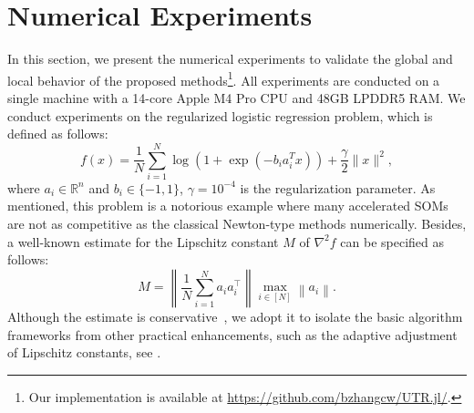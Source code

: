 \documentclass{article}
\begin{document}
\section{Numerical Experiments}\label{sec.experiments}
In this section, we present the numerical experiments to validate the global and local behavior of the proposed methods\footnote{Our implementation is available at \url{https://github.com/bzhangcw/UTR.jl/}.}. All experiments are conducted on a single machine with a 14-core Apple M4 Pro CPU and 48GB LPDDR5 RAM.
We conduct experiments on the regularized logistic regression problem, which is defined as follows:
\begin{equation}
    \label{eq.logistic regression}
    f(x) = \frac{1}{N} \sum_{i=1}^N \log (1 + \exp (-b_i a_i^T x)) + \frac{\gamma}{2}\|x\|^2,
\end{equation}
where $a_i \in \mathbb{R}^n$ and $b_i \in \{-1, 1\}$, $\gamma = 10^{-4}$ is the regularization parameter.
As mentioned, this problem is a notorious example where many accelerated SOMs are not as competitive as the classical Newton-type methods \cite{carmon2022optimal,chen2022accelerating,zhang2012on} numerically.
Besides, a well-known estimate for the Lipschitz constant $\widehat M$ of $\nabla^2 f$ can be specified as follows:
$$\widehat M = \left\|\frac{1}{N} \sum_{i=1}^N a_i a_i^{\top}\right\| \max _{i \in[N]}\left\|a_i\right\|.$$
Although the estimate is conservative~\cite{song2021unified}, we adopt it to isolate the basic algorithm frameworks from other practical enhancements, such as the adaptive adjustment of Lipschitz constants, see \cite{mishchenko2023regularized,cartis2011adaptive}.
\end{document}
